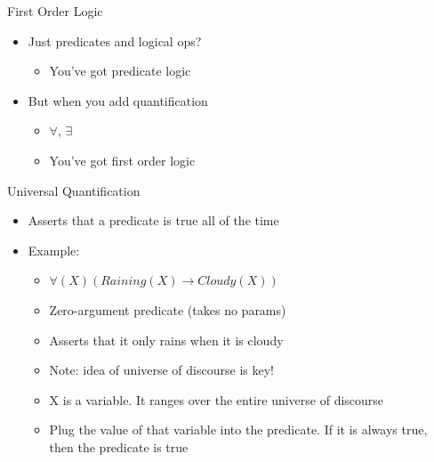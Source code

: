 \documentclass[aspectratio=169]{beamer}
\begin{document}
\begin{frame}{First Order Logic}

\begin{itemize}
\item Just predicates and logical ops?
	\begin{itemize}
	\item You've got predicate logic
	\end{itemize}
\item But when you add quantification
	\begin{itemize}
	\item $\forall$, $\exists$
	\item You've got first order logic 
	\end{itemize}
\end{itemize}
\end{frame}

\begin{frame}{Universal Quantification}

\begin{itemize}
\item Asserts that a predicate is true all of the time
\item Example:
	\begin{itemize}
	\item $\forall(X)(Raining(X) \rightarrow Cloudy(X))$
	\item Zero-argument predicate (takes no params)
	\item Asserts that it only rains when it is cloudy
	\item Note: idea of universe of discourse is key!
	\item X is a variable. It ranges over the entire universe of discourse
	\item Plug the value of that variable into the predicate. If it is always true, then the predicate is true

	\end{itemize}
\end{itemize}
\end{frame}
\end{document}
